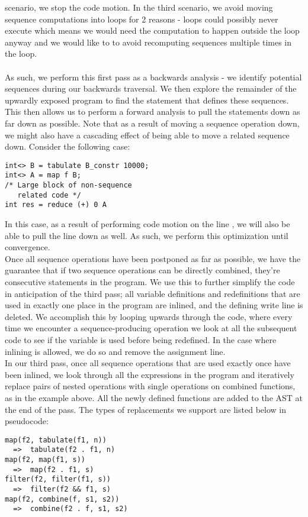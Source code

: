 \documentclass[a4paper,twocolumn]{article}
\begin{document}
scenario, we stop the code motion. In the third scenario, we avoid moving
sequence computations into loops for 2 reasons - loops could possibly never
execute which means we would need the computation to happen outside the loop
anyway and we would like to to avoid recomputing sequences
multiple times in the loop.
\\
\\As such, we perform this first pass as a backwards analysis - we identify
potential sequences during our backwards traversal. We then explore the
remainder of the upwardly exposed program to find the statement that defines
these sequences. This then allows us to perform a forward analysis to pull the
statements down as far down as possible. Note that as a result of moving a
sequence operation down, we might also have a cascading effect of being able to
move a related sequence down. Consider the following case:
\begin{verbatim}
int<> B = tabulate B_constr 10000;
int<> A = map f B;
/* Large block of non-sequence
   related code */
int res = reduce (+) 0 A
\end{verbatim}
In this case, as a result of performing code motion on the line , we will also be able to pull the line 
down as well. As such, we perform this optimization until convergence.\\

\noindent
Once all sequence operations have been postponed as far as possible, we have the guarantee that if two sequence operations can be directly combined, they're consecutive statements in the program. We use this to further simplify the code in anticipation of the third pass; all variable definitions and redefinitions that are used in exactly one place in the program are inlined, and the defining write line is deleted. We accomplish this by looping upwards through the code, where every time we encounter a sequence-producing operation we look at all the subsequent code to see if the variable is used before being redefined. In the case where inlining is allowed, we do so and remove the assignment line.\\

In our third pass, once all sequence operations that are used exactly once have been inlined, we look through all the expressions in the program and iteratively replace pairs of nested operations with single operations on combined functions, as in the example above. All the newly defined functions are added to the AST at the end of the pass. The types of replacements we support are listed below in pseudocode:
\begin{verbatim}
map(f2, tabulate(f1, n))
  =>  tabulate(f2 . f1, n)
map(f2, map(f1, s))
  =>  map(f2 . f1, s)
filter(f2, filter(f1, s))
  =>  filter(f2 && f1, s)
map(f2, combine(f, s1, s2))
  =>  combine(f2 . f, s1, s2)
\end{verbatim}
\end{document}
